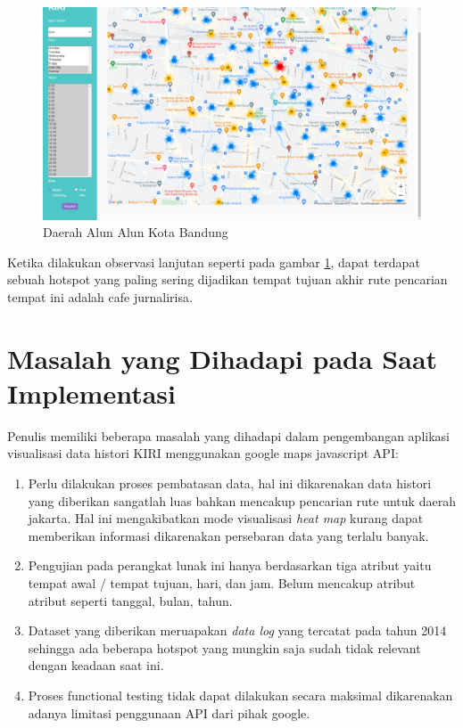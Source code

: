 \begin{figure}[H]
	\centering  
	\includegraphics[scale=0.3]{Gambar/pengujian/weekend-end-zoomed.png}  
	\caption[Daerah Alun Alun Kota Bandung ]{Daerah Alun Alun Kota Bandung } 
	\label{fig:weekendEndZoomed}
\end{figure}

Ketika dilakukan observasi lanjutan seperti pada gambar \ref{fig:weekendEndZoomed}, dapat terdapat sebuah  hotspot yang paling sering dijadikan tempat tujuan akhir  rute pencarian tempat ini adalah cafe jurnalirisa.




\section{Masalah yang Dihadapi pada Saat Implementasi}
Penulis memiliki beberapa masalah yang dihadapi dalam   pengembangan aplikasi visualisasi data histori KIRI menggunakan google maps javascript API:
\begin{enumerate}
	\item Perlu dilakukan proses pembatasan data, hal ini dikarenakan data histori yang diberikan sangatlah luas bahkan mencakup pencarian rute untuk daerah jakarta. Hal ini mengakibatkan mode visualisasi \textit{heat map} kurang dapat memberikan informasi dikarenakan persebaran data yang terlalu banyak.
	
	\item Pengujian pada perangkat lunak ini hanya berdasarkan tiga atribut yaitu tempat awal / tempat tujuan, hari, dan jam. Belum mencakup atribut atribut seperti tanggal, bulan, tahun.
	
	\item Dataset yang diberikan meruapakan \textit{data log} yang tercatat pada tahun 2014 sehingga ada beberapa hotspot yang mungkin saja sudah tidak relevant dengan keadaan saat ini.
	
	\item Proses functional testing tidak dapat dilakukan secara maksimal dikarenakan adanya limitasi penggunaan API dari pihak google.
	
	
\end{enumerate}